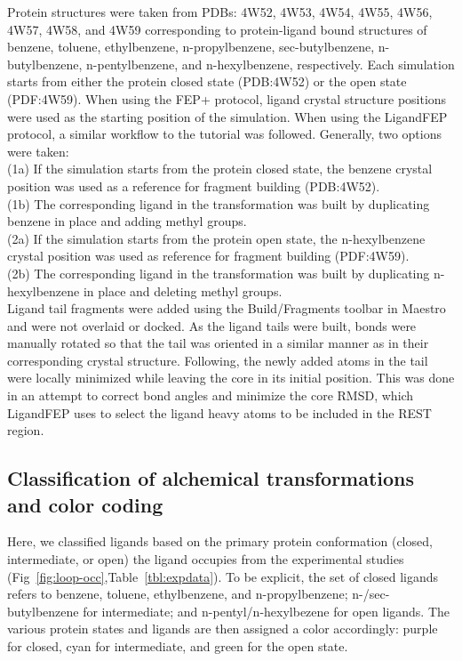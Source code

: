 \documentclass[journal=jctcce,manuscript=article]{achemso}
\begin{document}
Protein structures were taken from PDBs: 4W52, 4W53, 4W54, 4W55, 4W56, 4W57, 4W58, and 4W59 corresponding to protein-ligand bound structures of benzene, toluene, ethylbenzene, n-propylbenzene, sec-butylbenzene, n-butylbenzene, n-pentylbenzene, and n-hexylbenzene, respectively\cite{Merski2015}.
Each simulation starts from either the protein closed state (PDB:4W52) or the open state (PDF:4W59).
When using the FEP+ protocol, ligand crystal structure positions were used as the starting position of the simulation.
When using the LigandFEP protocol, a similar workflow to the tutorial\cite{LigandFEP} was followed.
Generally, two options were taken:\\
(1a) If the simulation starts from the protein closed state, the benzene crystal position was used as a reference for fragment building (PDB:4W52).\\
(1b) The corresponding ligand in the transformation was built by duplicating benzene in place and adding methyl groups.\\
(2a) If the simulation starts from the protein open state, the n-hexylbenzene crystal position was used as reference for fragment building (PDF:4W59).\\
(2b) The corresponding ligand in the transformation was built by duplicating n-hexylbenzene in place and deleting methyl groups.\\
Ligand tail fragments were added using the Build/Fragments toolbar in Maestro  and were not overlaid or docked. 
As the ligand tails were built, bonds were manually rotated so that the tail was oriented in a similar manner as in their corresponding crystal structure.
Following, the newly added atoms in the tail were locally minimized while leaving the core in its initial position.
This was done in an attempt to correct bond angles and minimize the core RMSD, which LigandFEP uses to select the ligand heavy atoms to be included in the REST region. 

\subsection*{Classification of alchemical transformations and color coding}
Here, we classified ligands based on the primary protein conformation (closed, intermediate, or open) the ligand occupies from the experimental studies (Fig~\ref{fig:loop-occ},Table~\ref{tbl:expdata}).
To be explicit, the set of closed ligands refers to benzene, toluene, ethylbenzene, and n-propylbenzene; n-/sec-butylbenzene for intermediate; and n-pentyl/n-hexylbezene for open ligands.
The various protein states and ligands are then assigned a color accordingly: purple for closed, cyan for intermediate, and green for the open state.
\end{document}
